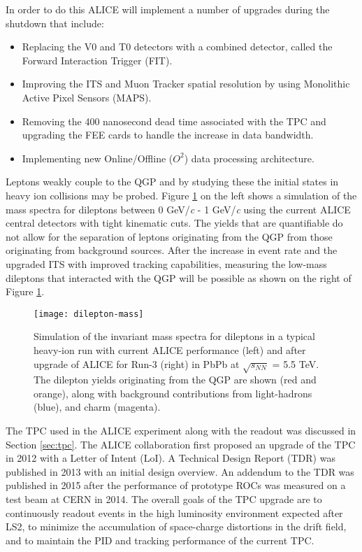 \noindent
In order to do this ALICE will implement a number of upgrades \cite{1742-6596-589-1-012014} during the shutdown that include:

\begin{itemize}
\item Replacing the V0 and T0 detectors with a combined detector, called the Forward Interaction Trigger (FIT)\cite{1742-6596-798-1-012186}.
\item Improving the ITS and Muon Tracker spatial resolution by using  Monolithic Active Pixel Sensors (MAPS)\cite{Abelev:1625842}\cite{CERN-LHCC-2015-001}.
\item Removing the 400 nanosecond dead time associated with the TPC and upgrading the FEE cards to handle the increase in data bandwidth\cite{Abelev:1475243}.
\item Implementing new Online/Offline ($O^{2}$) data processing architecture\cite{Buncic:2011297}.
\end{itemize}

Leptons weakly couple to the QGP\cite{Ryblewski:2015sha} and by studying these the initial states in heavy ion collisions may be probed\cite{Mauricio:2007vz}.  Figure \ref{fig:lowmassdilep} on the left shows a simulation of the mass spectra for dileptons between 0 GeV/\textit{c} - 1 GeV/\textit{c} using the current ALICE central detectors with tight kinematic cuts.  The yields that are quantifiable do not allow for the separation of leptons originating from the QGP from those originating from background sources.  After the increase in event rate and the upgraded ITS with improved tracking capabilities, measuring the low-mass dileptons that interacted with the QGP will be possible as shown on the right of Figure \ref{fig:lowmassdilep}. 

\begin{figure}[h]
\texttt{[image: dilepton-mass]}
\centering
\caption{Simulation of the invariant  mass spectra for dileptons in a typical heavy-ion run with current ALICE performance (left) and after upgrade of ALICE for Run-3 (right) in PbPb at $\sqrt{s_{NN}}$ = 5.5 TeV.  The dilepton yields originating from the QGP are shown (red and orange), along with background contributions from light-hadrons (blue), and charm (magenta)\cite{Abelev:1475243}.}
\label{fig:lowmassdilep}
\end{figure}


The TPC used in the ALICE experiment along with the readout was discussed in Section \ref{sec:tpc}.  The ALICE collaboration first proposed an upgrade of the TPC in 2012 with a Letter of Intent (LoI)\cite{Abelev:1475243}.  A Technical Design Report (TDR)\cite{CERN-LHCC-2013-020} was published in 2013 with an initial design overview.  An addendum to the TDR\cite{CERN-LHCC-2015-002} was published in 2015 after the performance of prototype ROCs was measured on a test beam at CERN in 2014.  The overall goals of the TPC upgrade are to continuously readout events in the high luminosity environment expected after LS2, to minimize the accumulation of space-charge distortions in the drift field, and to maintain the PID and tracking performance of the current TPC.


